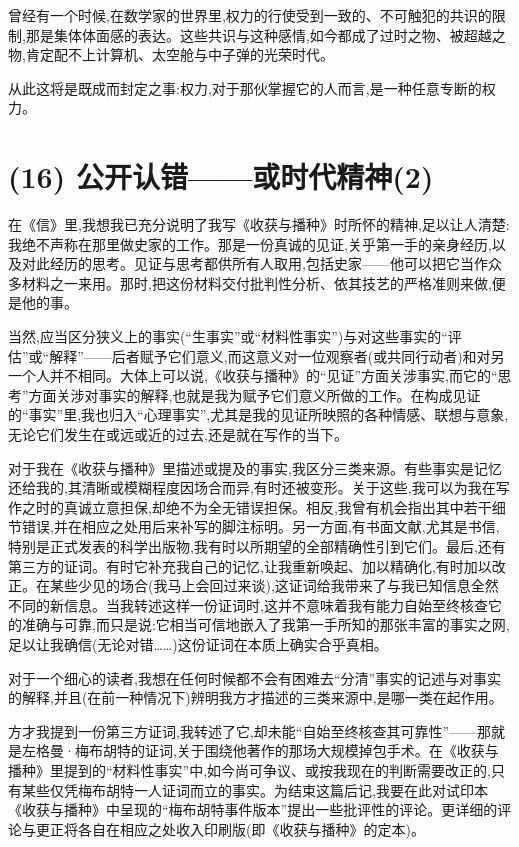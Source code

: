 曾经有一个时候,在数学家的世界里,权力的行使受到一致的、不可触犯的共识的限制,那是集体体面感的表达。这些共识与这种感情,如今都成了过时之物、被超越之物,肯定配不上计算机、太空舱与中子弹的光荣时代。

从此这将是既成而封定之事:权力,对于那伙掌握它的人而言,是一种任意专断的权力。

\section{(16) 公开认错——或时代精神(2)}

在《信》里,我想我已充分说明了我写《收获与播种》时所怀的精神,足以让人清楚:我绝不声称在那里做史家的工作。那是一份真诚的见证,关乎第一手的亲身经历,以及对此经历的思考。见证与思考都供所有人取用,包括史家——他可以把它当作众多材料之一来用。那时,把这份材料交付批判性分析、依其技艺的严格准则来做,便是他的事。

当然,应当区分狭义上的事实(“生事实”或“材料性事实”)与对这些事实的“评估”或“解释”——后者赋予它们意义,而这意义对一位观察者(或共同行动者)和对另一个人并不相同。大体上可以说,《收获与播种》的“见证”方面关涉事实,而它的“思考”方面关涉对事实的解释,也就是我为赋予它们意义所做的工作。在构成见证的“事实”里,我也归入“心理事实”,尤其是我的见证所映照的各种情感、联想与意象,无论它们发生在或远或近的过去,还是就在写作的当下。

对于我在《收获与播种》里描述或提及的事实,我区分三类来源。有些事实是记忆还给我的,其清晰或模糊程度因场合而异,有时还被变形。关于这些,我可以为我在写作之时的真诚立意担保,却绝不为全无错误担保。相反,我曾有机会指出其中若干细节错误,并在相应之处用后来补写的脚注标明。另一方面,有书面文献,尤其是书信,特别是正式发表的科学出版物,我有时以所期望的全部精确性引到它们。最后,还有第三方的证词。有时它补充我自己的记忆,让我重新唤起、加以精确化,有时加以改正。在某些少见的场合(我马上会回过来谈),这证词给我带来了与我已知信息全然不同的新信息。当我转述这样一份证词时,这并不意味着我有能力自始至终核查它的准确与可靠,而只是说:它相当可信地嵌入了我第一手所知的那张丰富的事实之网,足以让我确信(无论对错……)这份证词在本质上确实合乎真相。

对于一个细心的读者,我想在任何时候都不会有困难去“分清”事实的记述与对事实的解释,并且(在前一种情况下)辨明我方才描述的三类来源中,是哪一类在起作用。

\asterisms

方才我提到一份第三方证词,我转述了它,却未能“自始至终核查其可靠性”——那就是左格曼·梅布胡特的证词,关于围绕他著作的那场大规模掉包手术。在《收获与播种》里提到的“材料性事实”中,如今尚可争议、或按我现在的判断需要改正的,只有某些仅凭梅布胡特一人证词而立的事实。为结束这篇后记,我要在此对试印本《收获与播种》中呈现的“梅布胡特事件版本”提出一些批评性的评论。更详细的评论与更正将各自在相应之处收入印刷版(即《收获与播种》的定本)。


